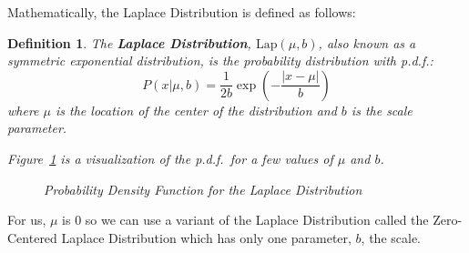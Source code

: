 \documentclass[conference,11pt]{IEEEtran}
\newtheorem{definition}{Definition}
\begin{document}
Mathematically, the Laplace Distribution is defined as follows:
\begin{mdframed}
    \begin{definition}\label{def:laplace}
        The \textbf{Laplace Distribution}, $\text{Lap}(\mu, b)$, also known as a
        symmetric exponential distribution, is the probability distribution with
        p.d.f.:
        \begin{equation}
            P(x|\mu, b) = \frac{1}{2b}\exp\left(-\frac{|x - \mu|}{b}\right)
        \end{equation}
        where $\mu$ is the location of the center of the distribution and $b$ is
        the scale parameter.

        Figure~\ref{fig:laplace-pdf} is a visualization of the p.d.f.\ for a few
        values of $\mu$ and $b$.\\

        \begin{figure}[H]
            \caption{Probability Density Function for the Laplace Distribution}
            \label{fig:laplace-pdf}
        \end{figure}
    \end{definition}
\end{mdframed}

For us, $\mu$ is 0 so we can use a variant of the Laplace Distribution called
the Zero-Centered Laplace Distribution which has only one parameter, $b$, the
scale.
\end{document}

